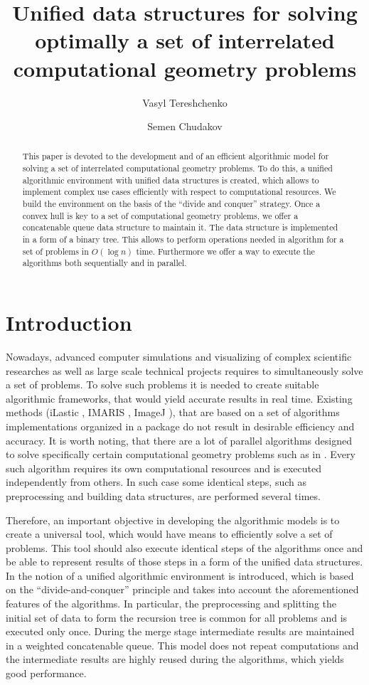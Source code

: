 \documentclass[a4paper,english,numberwithinsect,notab]{eurocg20-submission}
\title{Unified data structures for solving optimally a set of interrelated computational geometry problems}
\author[1]{Vasyl Tereshchenko}
\author[2]{Semen Chudakov}
\affil[1]{
	Faculty of computer science and cybernetics, Taras Shevchenko National University of Kyiv, Ukraine\\
  \texttt{vtereshch@gmail.com}}
\affil[2]{Faculty of computer science and cybernetics, Taras Shevchenko National University of Kyiv, Ukraine\\
  \texttt{semen.chudakov7@gmail.com}}
\begin{document}
\maketitle

\begin{abstract}
	This paper is devoted to the development and  of an efficient algorithmic model for solving a set of interrelated computational geometry problems. To do this, a unified algorithmic environment with unified data structures is created, which allows to implement complex use cases efficiently with respect to computational resources. We build the environment on the basis of the ``divide and conquer'' strategy. 
 	Once a convex hull is key to a set of computational geometry problems, we offer a concatenable queue data structure to maintain it. The data structure is implemented in a form of a binary tree. This allows to perform operations needed in algorithm for a set of problems in $O(\log n)$ time. Furthermore we offer a way to execute the algorithms both sequentially and in parallel.
\end{abstract}

\section{Introduction}
\label{sec:introduction}

	Nowadays, advanced computer simulations and visualizing of complex scientific researches as well as large scale technical projects requires to simultaneously solve a set of problems. To solve such problems it is needed to create suitable algorithmic frameworks, that would yield accurate results in real time. Existing methods (iLastic \cite{ilastik}, IMARIS \cite{imaris}, ImageJ \cite{imagej}), that are based on a set of algorithms implementations organized in a package do not result in desirable efficiency and accuracy. It is worth noting, that there are a lot of parallel algorithms designed to solve specifically certain computational geometry problems such as in \cite{aggarwal,atallah,cole,amato,chen,berkman,goodman,akl,jaja,leeuwen,reif}. Every such algorithm requires its own computational resources and is executed independently from others. In such case some identical steps, such as preprocessing and building data structures, are performed several times. 
	
	Therefore, an important objective in developing the algorithmic models is to create a universal tool, which would have means to efficiently solve a set of problems. This tool should also execute identical steps of the algorithms once and be able to represent results of those steps in a form of the unified data structures. In \cite{tereshchenko} the notion of a unified algorithmic environment is introduced, which is based on the ``divide-and-conquer'' principle and takes into account the aforementioned features of the algorithms. In particular, the preprocessing and splitting the initial set of data to form the recursion tree is common for all problems and is executed only once. During the merge stage intermediate results are maintained in a weighted concatenable queue. This model does not repeat computations and the intermediate results are highly reused during the algorithms, which yields good performance.
	
\end{document}
